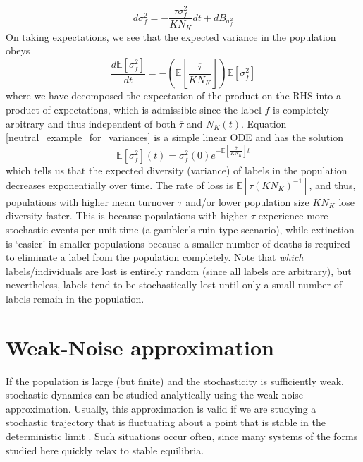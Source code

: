 \begin{equation}
d\sigma^2_f = - \frac{\overline{\tau}\sigma^2_{f}}{KN_K}dt + dB_{\sigma^2_{f}}
\end{equation}
On taking expectations, we see that the expected variance in the population obeys
\begin{equation}
\label{neutral_example_for_variances}
\frac{d \mathbb{E}[\sigma^2_f]}{dt} = - \left(\mathbb{E}\left[\frac{\overline{\tau}}{KN_K}\right]\right)\mathbb{E}[\sigma^2_{f}]
\end{equation}
where we have decomposed the expectation of the product on the RHS into a product of expectations, which is admissible since the label $f$ is completely arbitrary and thus independent of both $\overline{\tau}$ and $N_K(t)$. Equation \eqref{neutral_example_for_variances} is a simple linear ODE and has the solution
\begin{equation}
\mathbb{E}[\sigma^2_f](t) = \sigma^2_f(0)e^{-\mathbb{E}\left[\frac{\overline{\tau}}{KN_K}\right]t}
\end{equation}
which tells us that the expected diversity (variance) of labels in the population decreases exponentially over time. The rate of loss is $\mathbb{E}\left[\overline{\tau}(KN_K)^{-1}\right]$, and thus, populations with higher mean turnover $\overline{\tau}$  and/or lower population size $KN_K$ lose diversity faster. This is because populations with higher $\overline{\tau}$ experience more stochastic events per unit time (a gambler's ruin type scenario), while extinction is `easier' in smaller populations because a smaller number of deaths is required to eliminate a label from the population completely. Note that \emph{which} labels/individuals are lost is entirely random (since all labels are arbitrary), but nevertheless, labels tend to be stochastically lost until only a small number of labels remain in the population.


\section{Weak-Noise approximation}
If the population is large (but finite) and the stochasticity is sufficiently weak, stochastic dynamics can be studied analytically using the weak noise approximation. Usually, this approximation is valid if we are studying a stochastic trajectory that is fluctuating about a point that is stable in the deterministic limit \citep{van_kampen_stochastic_1981}. Such situations occur often, since many systems of the forms studied here quickly relax to stable equilibria.


